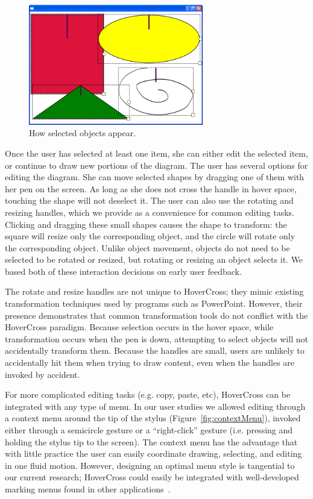 \documentclass{article}
\begin{document}
\begin{figure}[tb]
\includegraphics[width=3.0in]{SelectedObjects}
\caption{How selected objects appear.}
\label{fig:selection}
\end{figure}


Once the user has selected at least one item, she can either edit the
selected item, or continue to draw new portions of the diagram.  The
user has several options for editing the diagram.  She can move
selected shapes by dragging one of them with her pen on the
screen.  As long as she does not cross the handle in hover space,
touching the shape will not deselect it.  The user can also use the rotating and resizing handles, which we provide as
a convenience for common editing tasks.  Clicking and dragging these small shapes causes the shape to transform: the square will resize only the corresponding object, 
and the circle will rotate only the corresponding object.  
Unlike object movement, objects do not need to be selected 
to be rotated or resized, but rotating or resizing an object selects it.  
We based both of these interaction decisions on early user feedback.  

The rotate and resize handles are not unique to HoverCross; they mimic existing transformation techniques used by programs such as PowerPoint.  However, their presence demonstrates that common transformation tools do not conflict with the HoverCross paradigm.  Because selection occurs in the hover space, while transformation occurs when the pen is down, attempting to select objects will not accidentally transform them.  Because the handles are small, users are unlikely to accidentally hit them when trying to draw content, even when 
the handles are invoked by accident.


For more complicated editing tasks (e.g. copy, paste, etc), 
HoverCross can be integrated with any type of menu.  In our user studies we 
allowed editing through a context menu 
around the tip of the stylus (Figure~\ref{fig:contextMenu}), invoked either through a semicircle gesture or a 
``right-click'' gesture (i.e. pressing and holding the stylus tip to the screen).    The context menu has the advantage that with little
practice the user can easily coordinate drawing, selecting, and editing in one fluid motion.  However, designing an optimal 
menu style is tangential to our current research; HoverCross could easily be integrated with well-developed marking menus found in other
applications~\cite{Hinckley2007InkSeine,Zeleznik2008Lineogrammer}.  
\end{document}
